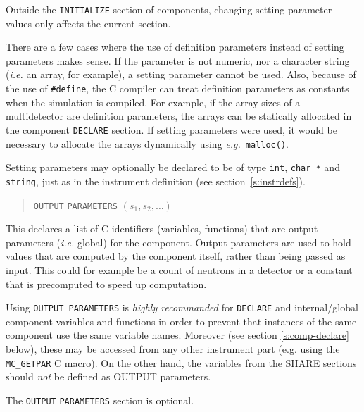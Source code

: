 Outside the \verb+INITIALIZE+ section of components, changing setting parameter values only affects the current section.

There are a few cases where the use of definition parameters instead of
setting parameters makes sense. If the parameter is not numeric, nor a character string ({\em i.e.} an
array, for example), a setting parameter cannot be
used. Also, because of the use of \verb+#define+, the C compiler can
treat definition parameters as constants when the simulation is
compiled. For example, if the array sizes of a multidetector are
definition parameters, the arrays can be statically allocated in the
component \verb+DECLARE+ section. If setting parameters were used, it
would be necessary to allocate the arrays dynamically using {\em e.g.}\
\verb+malloc()+.

Setting parameters may optionally be declared to be of type
\verb+int+, \verb+char *+ and \verb+string+, just as in the instrument definition (see section~\ref{s:instrdefs}).

\begin{quote}
  \texttt{OUTPUT} \texttt{PARAMETERS} $(s_1, s_2, \ldots)$
\end{quote}
This declares a list of C identifiers (variables, functions) that are
output parameters ({\it i.e.} global) for the
component. Output parameters are used to hold values that are computed
by the component itself, rather than being passed as input. This could
for example be a count of neutrons in a detector or a constant that is
precomputed to speed up computation.

Using \texttt{OUTPUT PARAMETERS} is \emph{highly recommanded} for
\texttt{DECLARE} and internal/global component variables and functions
in order to prevent that instances of the same component use the same variable names. Moreover (see section \ref{s:comp-declare} below), these may be accessed from any other instrument part (e.g. using the \verb+MC_GETPAR+ C macro).
On the other hand, the variables from the SHARE sections should \emph{not}
be defined as OUTPUT parameters.

The \texttt{OUTPUT} \texttt{PARAMETERS} section is optional.

